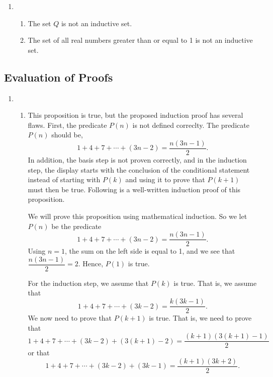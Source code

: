 \begin{enumerate}
\item \begin{enumerate}
\item The set $Q$ is not an inductive set.

\item The set of all real numbers greater than or equal to 1 is not an inductive set.
\end{enumerate}
\end{enumerate}


\subsection*{Evaluation of Proofs}
\setcounter{oldenumi}{\theenumi}
\begin{enumerate} \setcounter{enumi}{\theoldenumi}
\item \begin{enumerate}
\item This proposition is true, but the proposed induction proof has several flaws.  First, the predicate $P(n)$ is not defined correclty.  The predicate $P(n)$ should be,
\[
1 + 4 + 7 + \cdots + \left( 3n - 2 \right) = \frac{n(3n - 1)}{2}.
\]
In addition, the basis step is not proven correctly, and in the induction step, the display starts with the conclusion of the conditional statement instead of starting with $P(k)$ and using it to prove that $P(k + 1)$ must then be true.  Following is a well-written induction proof of this proposition.

\quarter
\setcounter{equation}{0}
\begin{myproof}
We will prove this proposition using mathematical induction.  So we let $P ( n )$ be the predicate
\[
1 + 4 + 7 + \cdots + \left( 3n - 2 \right) = \frac{n(3n - 1)}{2}.
\]
Using $n = 1$, the sum on the left side is equal to 1, and we see that 
$\dfrac{n(3n - 1)}{2} = 2$.  Hence, $P \left( 1 \right)$ is true.

For the induction step, we assume that $P( k )$ is true.  That is, we assume that
\begin{equation}
1 + 4 + 7 + \cdots + \left( 3k - 2 \right) = \frac{k \left(3k -1 \right)}{2} .
\end{equation}
We now need to prove that $P(k + 1)$ is true.  That is, we need to prove that
\[
1 + 4 + 7 + \cdots + ( 3k - 2 ) + \left( 3(k+1) - 2 \right) = \frac{(k + 1) \left(3(k + 1) -1 \right)}{2}
\]
or that
\begin{equation}
1 + 4 + 7 + \cdots + ( 3k - 2 ) + (3k - 1) = \frac{(k + 1) (3k + 2)}{2}.
\end{equation}


\end{myproof}
\end{enumerate}
\end{enumerate}
